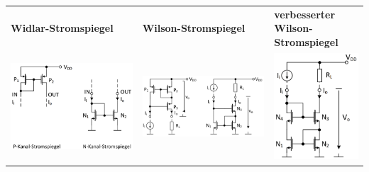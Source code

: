 \begin{tabular}{|l|l|l|}
    \hline
    \textbf{Widlar-Stromspiegel} & \textbf{Wilson-Stromspiegel} & \makecell[l]{\textbf{verbesserter}\\ \textbf{Wilson-Stromspiegel}}\\
    \includegraphics[width=7cm]{Widlar Stromspiegel.png} & \includegraphics[width=7cm]{Wilson Stromspiegel.png}  & \includegraphics[width=4cm]{Verbesserter Wilson Stromspiegel.png}\\
    \hline
\end{tabular}\\
